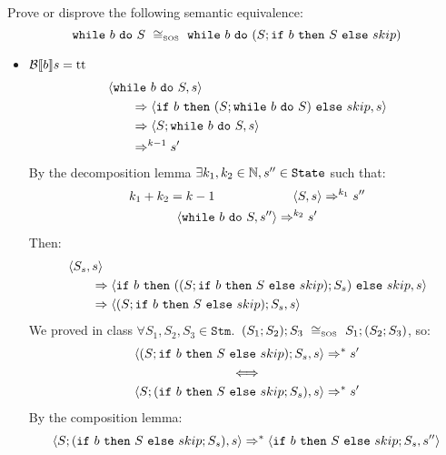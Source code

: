 \begin{exercise}{
    Prove or disprove the following semantic equivalence:
    \[ \wwhile{b}{S}\ \SOScong\ \wwhile{b}{(S;\wif{b}{S}{skip})} \]
}
\begin{itemize}
\begin{itemize}
\begin{itemize}
                        \item $\mathcal{B} \llbracket b \rrbracket s = \text{tt}$
                            \begin{align*}
                                &\left<\texttt{while}\ b\ \texttt{do}\ S, s\right>
                                \\&\qquad\Rightarrow \left<\texttt{if}\ b\ \texttt{then}\ (S; \texttt{while}\ b\ \texttt{do}\ S)\ \texttt{else}\ skip, s\right>
                                \\&\qquad\Rightarrow \left<S; \texttt{while}\ b\ \texttt{do}\ S, s\right>
                                \\&\qquad\Rightarrow^{k-1} s'
                            \end{align*}
                            By the decomposition lemma $\exists k_1, k_2 \in \mathbb{N}, s'' \in \texttt{State}$ such that:
                            \begin{gather*}
                                k_1 + k_2 = k - 1 \qquad\qquad\qquad \left<S, s\right> \Rightarrow^{k_1} s'' \\
                                \left<\texttt{while}\ b\ \texttt{do}\ S, s''\right> \Rightarrow^{k_2} s'
                            \end{gather*}
                            Then:
                            \begin{align*}
                                &\left<S_s, s\right>
                                \\&\qquad\Rightarrow \left<\texttt{if}\ b\ \texttt{then}\ ((S;\texttt{if}\ b\ \texttt{then}\ S\ \texttt{else}\ skip);S_s)\ \texttt{else}\ skip, s\right>
                                \\&\qquad\Rightarrow \left<(S;\texttt{if}\ b\ \texttt{then}\ S\ \texttt{else}\ skip);S_s, s\right>
                            \end{align*}
                            We proved in class $\forall S_1, S_2, S_3 \in \texttt{Stm}$.\ $(S_1;S_2);S_3\ \cong_{\text{\tiny SOS}}\ S_1;(S_2;S_3)$, so:
                            \begin{gather*}
                                \left<(S;\texttt{if}\ b\ \texttt{then}\ S\ \texttt{else}\ skip);S_s, s\right> \Rightarrow^* s'
                                \\
                                \iff
                                \\
                                \left<S;(\texttt{if}\ b\ \texttt{then}\ S\ \texttt{else}\ skip;S_s), s\right> \Rightarrow^* s'
                            \end{gather*}
                            By the composition lemma:
                            \[
                                \left<S;(\texttt{if}\ b\ \texttt{then}\ S\ \texttt{else}\ skip;S_s), s\right>
                                \Rightarrow^*
                                \left<\texttt{if}\ b\ \texttt{then}\ S\ \texttt{else}\ skip;S_s, s''\right>
\]
\end{itemize}
\end{itemize}
\end{itemize}
\end{exercise}
